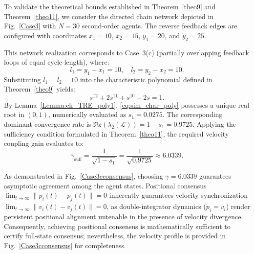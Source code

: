 
To validate the theoretical bounds established in Theorem~\ref{theo9} and Theorem~\ref{theo11}, we consider the directed chain network depicted in Fig.~\ref{Case3} with $N = 30$ second-order agents. The reverse feedback edges are configured with coordinates $x_1 = 10$, $x_2 = 15$, $y_1 = 20$, and $y_2 = 25$. 

This network realization corresponds to Case~3(c) (partially overlapping feedback loops of equal cycle length), where:
\begin{equation}
    l_1 = y_1 - x_1 = 10, \quad l_2 = y_2 - x_2 = 10.
\end{equation}
Substituting $l_1 = l_2 = 10$ into the characteristic polynomial defined in Theorem~\ref{theo9} yields:
\begin{equation}
    s^{12} + 2s^{11} + s^{10} - 2s = 1.
    \label{eq:sim_char_poly}
\end{equation}
By Lemma~\ref{Lemma:ch_TRE_poly1}, \eqref{eq:sim_char_poly} possesses a unique real root in $(0, 1)$, numerically evaluated as $s_1 = 0.0275$. The corresponding dominant convergence rate is $\mathfrak{Re}(\lambda_2(\mathcal{L})) = 1 - s_1 = 0.9725$. Applying the sufficiency condition formulated in Theorem~\ref{theo11}, the required velocity coupling gain evaluates to:
\begin{equation}
    \gamma_{\text{suff}} = \frac{1}{\sqrt{1 - s_1}} = \frac{1}{\sqrt{0.9725}} \approx 6.0339.
\end{equation}

As demonstrated in Fig.~\ref{Case3cconsensus}, choosing $\gamma = 6.0339$ guarantees asymptotic agreement among the agent states. Positional consensus $\lim_{t \to \infty} \|p_i(t) - p_j(t)\| = 0$ inherently guarantees velocity synchronization $\lim_{t \to \infty} \|v_i(t) - v_j(t)\| = 0$, as double-integrator dynamics ($\dot{p}_i = v_i$) render persistent positional alignment untenable in the presence of velocity divergence. Consequently, achieving positional consensus is mathematically sufficient to certify full-state consensus; nevertheless, the velocity profile is provided in Fig.~\ref{Case3cconsensus} for completeness.

